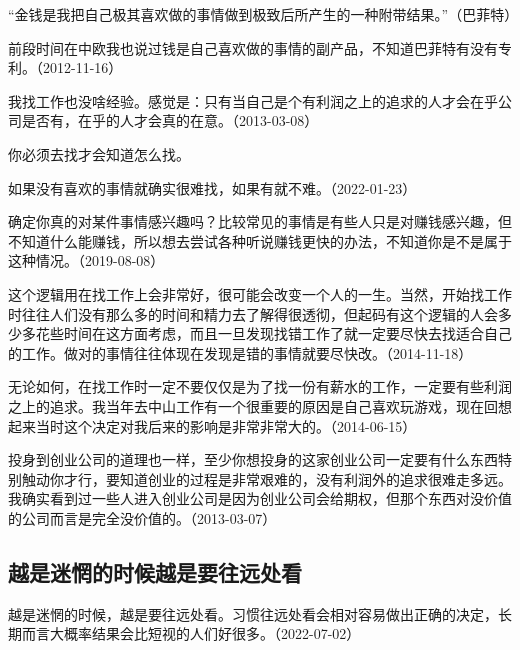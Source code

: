 “金钱是我把自己极其喜欢做的事情做到极致后所产生的一种附带结果。”（巴菲特）

前段时间在中欧我也说过钱是自己喜欢做的事情的副产品，不知道巴菲特有没有专利。（2012-11-16）


我找工作也没啥经验。感觉是：只有当自己是个有利润之上的追求的人才会在乎公司是否有，在乎的人才会真的在意。（2013-03-08）


你必须去找才会知道怎么找。

如果没有喜欢的事情就确实很难找，如果有就不难。（2022-01-23）


确定你真的对某件事情感兴趣吗？比较常见的事情是有些人只是对赚钱感兴趣，但不知道什么能赚钱，所以想去尝试各种听说赚钱更快的办法，不知道你是不是属于这种情况。（2019-08-08）


这个逻辑用在找工作上会非常好，很可能会改变一个人的一生。当然，开始找工作时往往人们没有那么多的时间和精力去了解得很透彻，但起码有这个逻辑的人会多少多花些时间在这方面考虑，而且一旦发现找错工作了就一定要尽快去找适合自己的工作。做对的事情往往体现在发现是错的事情就要尽快改。（2014-11-18）

无论如何，在找工作时一定不要仅仅是为了找一份有薪水的工作，一定要有些利润之上的追求。我当年去中山工作有一个很重要的原因是自己喜欢玩游戏，现在回想起来当时这个决定对我后来的影响是非常非常大的。（2014-06-15）

投身到创业公司的道理也一样，至少你想投身的这家创业公司一定要有什么东西特别触动你才行，要知道创业的过程是非常艰难的，没有利润外的追求很难走多远。我确实看到过一些人进入创业公司是因为创业公司会给期权，但那个东西对没价值的公司而言是完全没价值的。（2013-03-07）

\subsection{越是迷惘的时候越是要往远处看}

越是迷惘的时候，越是要往远处看。习惯往远处看会相对容易做出正确的决定，长期而言大概率结果会比短视的人们好很多。（2022-07-02）


